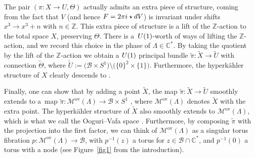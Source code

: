 \documentclass[11pt]{article}
\numberwithin{equation}{section}
\numberwithin{equation}{section}
\begin{document}
The pair $(\pi\colon X\to U, \Theta)$ actually admits an extra piece of structure, coming from the fact that $V$ (and hence $F=2\pi {\rm i} \star {\rm d}V$) is invariant under shifts $x^3\to x^3+n$ with $n\in \mathbb{Z}$. This extra piece of structure is a lift of the $\mathbb{Z}$-action to the total space $X$, preserving $\Theta$. There is a~${\rm U}(1)$-worth of ways of lifting the $\mathbb{Z}$-action, and we record this choice in the phase of $\Lambda \in \mathbb{C}^*$. By taking the quotient by the lift of the $\mathbb{Z}$-action we obtain a ${\rm U}(1)$ principal bundle $\widetilde{\pi}\colon\widetilde{X}\to \widetilde{U}$ with connection $\widetilde{\Theta}$, where $\widetilde{U}:=\bigl(\mathcal{B}\times S^1\bigr)\setminus \bigl(\{0\}^2\times \{1\}\bigr)$. Furthermore, the hyperk\"ahler structure of $X$ clearly descends to .

Finally, one can show that by adding a point $\widetilde{X}$, the map $\widetilde{\pi}\colon\widetilde{X}\to \widetilde{U}$ smoothly extends to a~map $\widetilde{\pi}\colon \mathcal{M}^{\text{ov}}(\Lambda)\to \mathcal{B}\times S^1$ \cite[Proposition 3.2]{GW}, where $\mathcal{M}^{\text{ov}}(\Lambda)$ denotes $\widetilde{X}$ with the extra point. The hyperk\"ahler structure of $\widetilde{X}$ also smoothly extends to $\mathcal{M}^{\text{ov}}(\Lambda)$, which is what we call the Ooguri--Vafa space \cite[Section 4.1]{GMN1}. Furthermore, by composing $\widetilde{\pi}$ with the projection into the first factor, we can think of $\mathcal{M}^{\text{ov}}(\Lambda)$ as a singular torus fibration $p\colon\mathcal{M}^{\text{ov}}(\Lambda)\to \mathcal{B}$, with $p^{-1}(z)$ a torus for $z\in \mathcal{B}\cap \mathbb{C}^*$, and $p^{-1}(0)$ a torus with a node (see Figure~\ref{fig1} from the introduction).
\end{document}
